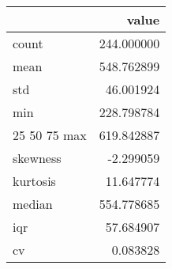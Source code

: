 \begin{tabular}{lr}
\toprule
 & value \\
\midrule
count & 244.000000 \\
mean & 548.762899 \\
std & 46.001924 \\
min & 228.798784 \\
25%
50%
75%
max & 619.842887 \\
skewness & -2.299059 \\
kurtosis & 11.647774 \\
median & 554.778685 \\
iqr & 57.684907 \\
cv & 0.083828 \\
\bottomrule
\end{tabular}
